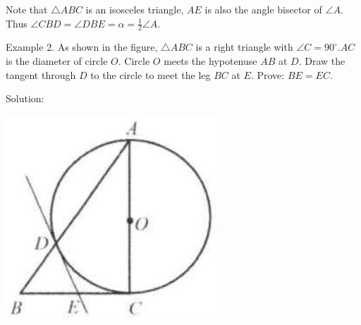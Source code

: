 \documentclass[10pt]{article}
\begin{document}
Note that \(\triangle A B C\) is an isosceles triangle, \(A E\) is also the angle bisector of \(\angle A\).\\
Thus \(\angle C B D=\angle D B E=\alpha=\frac{1}{2} \angle A\).

Example 2. As shown in the figure, \(\triangle A B C\) is a right triangle with \(\angle C=90^{\circ} . A C\) is the diameter of circle \(O\). Circle \(O\) meets the hypotenuse \(A B\) at \(D\). Draw the tangent through \(D\) to the circle to meet the leg \(B C\) at \(E\). Prove: \(B E=E C\).

Solution:
\begin{center}
\includegraphics[max width=\textwidth]{2025_04_17_97bc1f7e44d93c271a88g-194(3)}
\end{center}
\end{document}
